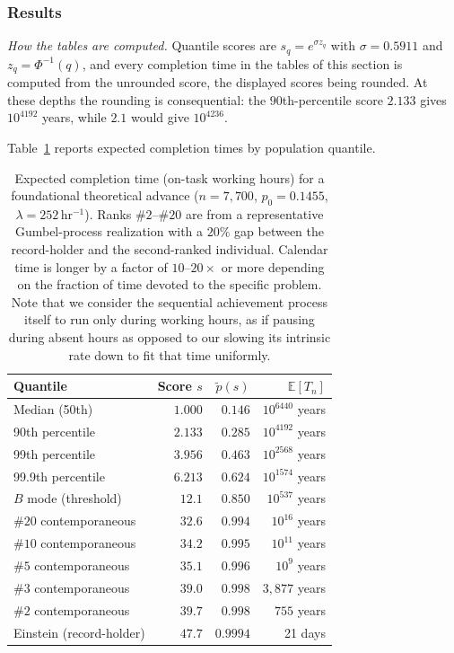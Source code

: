 \documentclass{article}
\begin{document}
\subsubsection{Results}
\noindent\textit{How the tables are computed.} Quantile scores are $s_q = e^{\sigma z_q}$ with $\sigma = 0.5911$ and $z_q = \Phi^{-1}(q)$, and every completion time in the tables of this section is computed from the unrounded score, the displayed scores being rounded. At these depths the rounding is consequential: the $90$th-percentile score $2.133$ gives $10^{4192}$ years, while $2.1$ would give $10^{4236}$.


Table~\ref{tab:physics-completion} reports expected completion times by
population quantile.

\begin{table}[ht]
  \centering
  \caption{Expected completion time (on-task working hours) for a
           foundational theoretical advance ($n = 7{,}700$, $p_0 = 0.1455$,
           $\lambda = 252\,$hr$^{-1}$). Ranks $\#2$--$\#20$ are from
           a representative Gumbel-process realization with a $20\%$ gap
           between the record-holder and the second-ranked individual.
           Calendar time is longer by a factor of $10$--$20\times$ or more
           depending on the fraction of time devoted to the specific
           problem\protect\footnotemark. Note that we consider the sequential achievement process itself to run only during working hours, as if pausing during absent hours as opposed to our slowing its intrinsic rate down to fit that time uniformly.}
  \label{tab:physics-completion}
  \medskip
  \begin{tabular}{l r r r}
    \hline
    Quantile & Score $s$ & $\widetilde{p}(s)$ &
    $\mathbb{E}[T_n]$ \\
    \hline
    Median (50th) & $1.000$ & $0.146$ & $10^{6440}$ years \\
    90th percentile & $2.133$ & $0.285$ & $10^{4192}$ years \\
    99th percentile & $3.956$ & $0.463$ & $10^{2568}$ years \\
    99.9th percentile & $6.213$ & $0.624$ & $10^{1574}$ years \\
    $B$ mode (threshold)  & $12.1$  & $0.850$ & $10^{537}$ years \\
    \hline
    $\#20$ contemporaneous & $32.6$ & $0.994$ & $10^{16}$ years \\
    $\#10$ contemporaneous & $34.2$ & $0.995$ & $10^{11}$ years \\
    $\#5$ contemporaneous  & $35.1$ & $0.996$ & $10^{9}$ years \\
    $\#3$ contemporaneous  & $39.0$ & $0.998$ & $3{,}877$ years \\
    $\#2$ contemporaneous  & $39.7$ & $0.998$ & $755$ years \\
    Einstein (record-holder) & $47.7$ & $0.9994$ & 21 days \\
    \hline
  \end{tabular}
\end{table}
\end{document}
